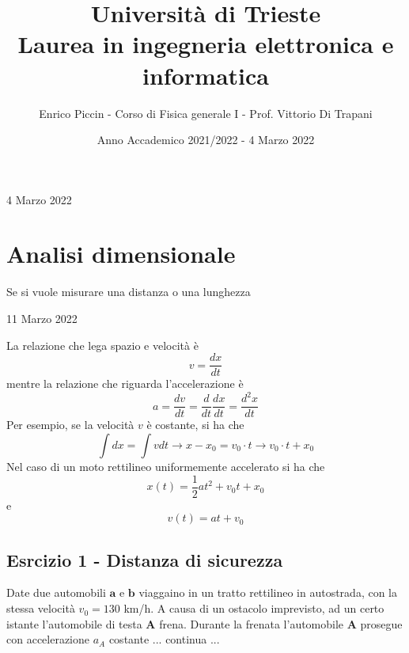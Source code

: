 \documentclass[a4paper]{extarticle}
\title{\textbf{Università di Trieste\\ \vspace{1em}
Laurea in ingegneria elettronica e informatica}}
\author{Enrico Piccin - Corso di Fisica generale I - Prof. Vittorio Di Trapani}
\date{Anno Accademico 2021/2022 - 4 Marzo 2022}
\begin{document}
\vspace{-10mm}
\maketitle

\tableofcontents
\newpage

\noindent
\begin{center}
  4 Marzo 2022
\end{center}

\section{Analisi dimensionale}
Se si vuole misurare una distanza o una lunghezza

\newpage
\noindent
\begin{center}
  11 Marzo 2022
\end{center}
La relazione che lega spazio e velocità è
\[v = \frac{dx}{dt}\]
mentre la relazione che riguarda l'accelerazione è
\[a = \frac{dv}{dt} = \frac{d}{dt} \frac{dx}{dt} = \frac{d^2x}{dt}\]
Per esempio, se la velocità $v$ è costante, si ha che
\[\int dx = \int v dt \longrightarrow x - x_0 = v_0 \cdot t \longrightarrow \boxed{v_0 \cdot t + x_0}\]
Nel caso di un moto rettilineo uniformemente accelerato si ha che
\[\boxed{x(t) = \frac{1}{2} a t^2 + v_0 t + x_0}\]
e
\[\boxed{v(t) = at + v_0}\]

\vspace{1em}
\subsection{Esrcizio 1 - Distanza di sicurezza}
Date due automobili $\boldsymbol{a}$ e $\boldsymbol{b}$ viaggaino in un tratto rettilineo in autostrada, con la stessa velocità $v_0 = 130$ km/h. A causa di un ostacolo imprevisto, ad un certo istante l'automobile di testa $\boldsymbol{A}$ frena. Durante la frenata l'automobile $\boldsymbol{A}$ prosegue con accelerazione $a_A$ costante ... continua ...
\end{document}
